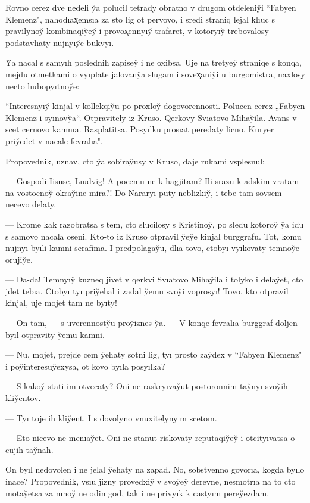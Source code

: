\documentclass[10pt]{book}
\begin{document}
Rovno cerez dve nedeli y̆a polucil tetrady obratno v drugom otdeleniy̆i ``Fabyen Klemenz", nahodıax̨emsıa za sto lig ot pervovo, i sredi straniq lejal klıuc s pravilynoy̆ kombinaqiy̆ey̆ i provox̨ennyıy̆ trafaret, v kotoryıy̆ trebovalosy podstavlıaty nujnyıy̆e bukvyı.

Y̆a nacal s samyıh poslednih zapisey̆ i ne oxibsa. Uje na tretyey̆ straniqe s konqa, mejdu otmetkami o vyıplate jalovany̆a slugam i sovex̨aniy̆i u burgomistra, naxlosy necto lıubopyıtnoy̆e:

``Interesnyıy̆ kinjal v kollekqiy̆u po proxloy̆ dogovorennosti. Polucen cerez „Fabyen Klemenz i syınovy̆a“. Otpravitely iz Kruso. Qerkovy Svıatovo Mihay̆ila. Avans v scet cernovo kamnıa. Rasplatitsa. Posyılku prosıat peredaty licno. Kuryer priy̆edet v nacale fevralıa".



Propovednik, uznav, cto y̆a sobiray̆usy v Kruso, daje rukami vsplesnul:

— Gospodi Iisuse, Lıudvig! A pocemu ne k hagjitam? Ili srazu k adskim vratam na vostocnoy̆ okray̆ine mira?! Do Nararyı puty neblizkiy̆, i tebe tam sovsem necevo delaty.

— Krome kak razobratsa s tem, cto slucilosy s Kristinoy̆, po sledu kotoroy̆ y̆a idu s samovo nacala oseni. Kto-to iz Kruso otpravil y̆ey̆e kinjal burggrafu. Tot, komu nujnyı byıli kamni serafima. I predpolagay̆u, dlıa tovo, ctobyı vyıkovaty temnoy̆e orujiy̆e.

— Da-da! Temnyıy̆ kuzneq jivet v qerkvi Svıatovo Mihay̆ila i tolyko i delay̆et, cto jdet tebıa. Ctobyı tyı priy̆ehal i zadal y̆emu svoy̆i voprosyı! Tovo, kto otpravil kinjal, uje mojet tam ne byıty!

— On tam, — s uverennosty̆u proy̆iznes y̆a. — V konqe fevralıa burggraf doljen byıl otpravity y̆emu kamni.

— Nu, mojet, prejde cem y̆ehaty sotni lig, tyı prosto zay̆dex v ``Fabyen Klemenz" i poy̆interesuy̆exysa, ot kovo byıla posyılka?

— S kakoy̆ stati im otvecaty? Oni ne raskryıvay̆ut postoronnim tay̆nyı svoy̆ih kliy̆entov.

— Tyı toje ih kliy̆ent. I s dovolyno vnuxitelynyım scetom.

— Eto nicevo ne menıay̆et. Oni ne stanut riskovaty reputaqiy̆ey̆ i otcityıvatsa o cujih tay̆nah.

On byıl nedovolen i ne jelal y̆ehaty na zapad. No, sobstvenno govorıa, kogda byılo inace? Propovednik, vsıu jizny provedxiy̆ v svoy̆ey̆ derevne, nesmotrıa na to cto motay̆etsa za mnoy̆ ne odin god, tak i ne privyık k castyım perey̆ezdam.
\end{document}
